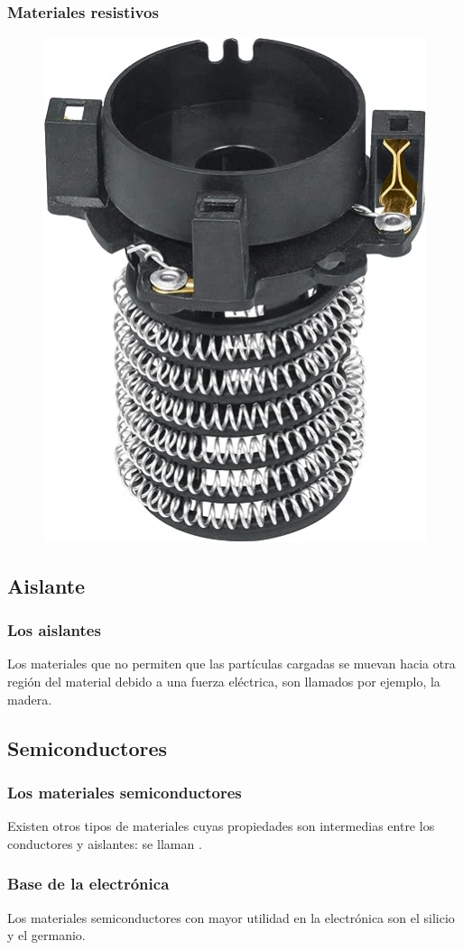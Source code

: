 \documentclass[14pt]{beamer}
\begin{document}
\begin{frame}
\frametitle{Materiales resistivos}
\begin{figure}
    \centering
    \includegraphics[scale=0.3]{Imagenes/Materiales_Conductores_02.jpg}
\end{figure}
\end{frame}
    
\subsection{Aislante}

\begin{frame}
\frametitle{Los aislantes}
Los materiales que no permiten que las partículas cargadas se muevan hacia otra región del material debido a una fuerza eléctrica, son llamados  por ejemplo, la madera.
\end{frame}

\subsection{Semiconductores}

\begin{frame}
\frametitle{Los materiales semiconductores}
Existen otros tipos de materiales cuyas propiedades son intermedias entre los conductores y aislantes: \pause  se llaman .
\end{frame}
\begin{frame}
\frametitle{Base de la electrónica}
Los materiales semiconductores con mayor utilidad en la electrónica son el silicio y el germanio.
\end{frame}
\end{document}
